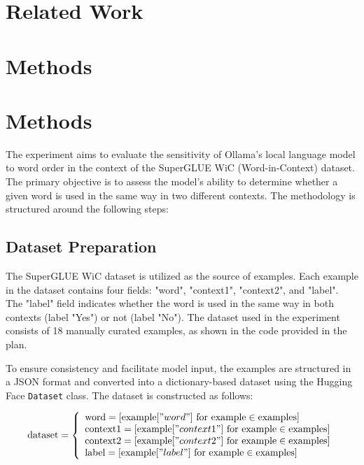 \documentclass{article}
\begin{document}
\section{Related Work}

\section{Methods}
\section{Methods}

The experiment aims to evaluate the sensitivity of Ollama's local language model to word order in the context of the SuperGLUE WiC (Word-in-Context) dataset. The primary objective is to assess the model's ability to determine whether a given word is used in the same way in two different contexts. The methodology is structured around the following steps:

\subsection{Dataset Preparation}

The SuperGLUE WiC dataset is utilized as the source of examples. Each example in the dataset contains four fields: "word", "context1", "context2", and "label". The "label" field indicates whether the word is used in the same way in both contexts (label "Yes") or not (label "No"). The dataset used in the experiment consists of 18 manually curated examples, as shown in the code provided in the plan.

To ensure consistency and facilitate model input, the examples are structured in a JSON format and converted into a dictionary-based dataset using the Hugging Face \texttt{Dataset} class. The dataset is constructed as follows:

$$
\text{dataset} = \left\{
\begin{array}{l}
\text{word} = [\text{example}["word"] \text{ for } \text{example} \in \text{examples}] \\
\text{context1} = [\text{example}["context1"] \text{ for } \text{example} \in \text{examples}] \\
\text{context2} = [\text{example}["context2"] \text{ for } \text{example} \in \text{examples}] \\
\text{label} = [\text{example}["label"] \text{ for } \text{example} \in \text{examples}]
\end{array}
\right.
$$
\end{document}
